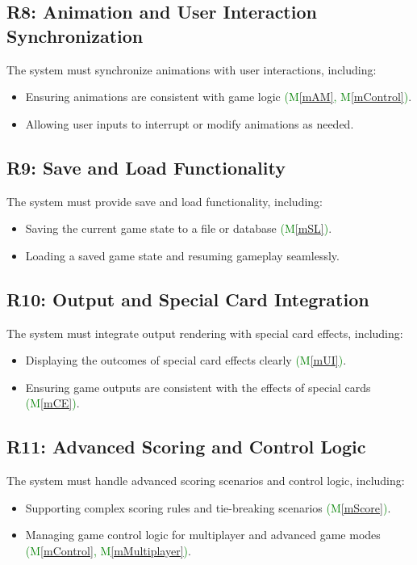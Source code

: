 \documentclass[12pt, titlepage]{article}
\newcommand{\added}[1]{\textcolor{green}{#1}}
\newcommand{\mref}[1]{M\ref{#1}}
\begin{document}
\subsection{R8: Animation and User Interaction Synchronization}
The system must synchronize animations with user interactions, including:
\begin{itemize}
    \item Ensuring animations are consistent with game logic \added{(\mref{mAM}, \mref{mControl})}.
    \item Allowing user inputs to interrupt or modify animations as needed.
\end{itemize}

\subsection{R9: Save and Load Functionality}
The system must provide save and load functionality, including:
\begin{itemize}
    \item Saving the current game state to a file or database \added{(\mref{mSL})}.
    \item Loading a saved game state and resuming gameplay seamlessly.
\end{itemize}

\subsection{R10: Output and Special Card Integration}
The system must integrate output rendering with special card effects, including:
\begin{itemize}
    \item Displaying the outcomes of special card effects clearly \added{(\mref{mUI})}.
    \item Ensuring game outputs are consistent with the effects of special cards \added{(\mref{mCE})}.
\end{itemize}

\subsection{R11: Advanced Scoring and Control Logic}
The system must handle advanced scoring scenarios and control logic, including:
\begin{itemize}
    \item Supporting complex scoring rules and tie-breaking scenarios \added{(\mref{mScore})}.
    \item Managing game control logic for multiplayer and advanced game modes \added{(\mref{mControl}, \mref{mMultiplayer})}.
\end{itemize}
\end{document}
